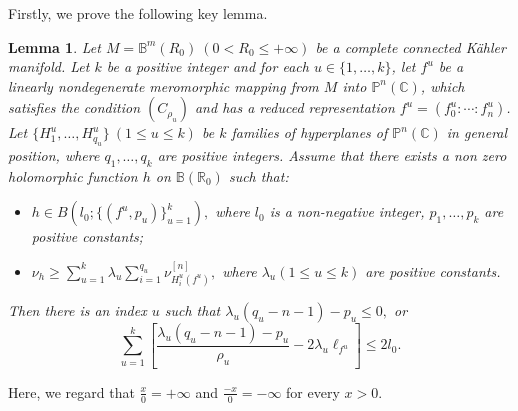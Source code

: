 \documentclass[12pt, a4paper, oneside]{amsart}
\newtheorem{lemma}[equation]{Lemma}
\newcommand{\C}{{\mathbb{C}}}
\newcommand{\B}{\mathbb{B}}
\renewcommand{\P}{{\mathbb{P}}}
\newcommand{\R}{{\mathbb{R}}}
\numberwithin{equation}{section}
\begin{document}
Firstly, we prove the following key lemma.
\begin{lemma}\label{3.1} 
	Let $M=\B^m(R_0)\ (0<R_0\le +\infty)$ be a complete connected K\"{a}hler manifold. Let $k$ be a positive integer and for each $u\in\{1,\ldots,k\}$, let $f^u$ be a linearly nondegenerate meromorphic mapping from $M$ into $\P^n(\C)$, which satisfies the condition $(C_{\rho_u})$ and has a reduced representation $f^u=(f_{0}^u:\cdots :f_{n}^u)$. Let $\{H^u_1,\ldots,H^u_{q_u}\}\ (1\le u\le k)$ be $k$ families of hyperplanes of $\P^n(\C)$ in general position, where $q_1,\ldots,q_k$ are positive integers. Assume that there exists a non zero holomorphic function $h$ on $\B(\R_0)$ such that:
\begin{itemize}
\item[(a)] $ h\in B(l_0;\{(f^u,p_u)\}_{u=1}^k),$ where $l_0$ is a non-negative integer, $p_1,\ldots,p_k$ are positive constants;
\item[(b)] $\nu_h\ge\sum_{u=1}^k\lambda_u\sum_{i=1}^{q_u}\nu^{[n]}_{H^u_i(f^u)},$ where $\lambda_u (1\le u\le k)$ are positive constants. 
\end{itemize}
Then there is an index $u$ such that $\lambda_u(q_u-n-1)-p_u\le 0,$ or 
$$ \sum_{u=1}^k\left [\frac{\lambda_u(q_u-n-1)-p_u}{\rho_u}-2\lambda_u \ell_{f^u}\right ]\le 2l_0.$$
\end{lemma}
Here, we regard that $\frac{x}{0}=+\infty$ and $\frac{-x}{0}=-\infty$ for every $x>0$. 
\end{document}
